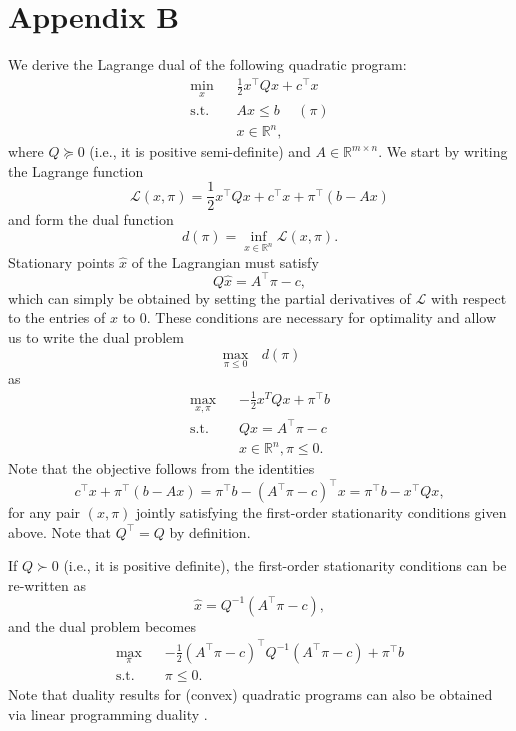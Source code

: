 \documentclass{article}
\begin{document}
\section*{Appendix B}
We derive the Lagrange dual of the following quadratic program:
\begin{align*}
\underset{x}{\min} \hspace{10pt} & \frac{1}{2}x^\top Q x + c^\top x\\
\mbox{s.t. } & Ax \le b \hspace{15pt} (\pi)\\
&x \in \mathbb{R}^n,
\end{align*}
where $Q \succeq 0$ (i.e., it is positive semi-definite) and $A \in \mathbb{R}^{m \times n}$. We start by writing the Lagrange function
\begin{equation*}
\mathcal{L}(x, \pi) = \frac{1}{2}x^\top Q x + c^\top x + \pi^\top(b - Ax)
\end{equation*}
and form the dual function
\begin{equation*}
d(\pi) = \underset{x \in \mathbb{R}^n}{\inf} \mathcal{L}(x, \pi).
\end{equation*}
Stationary points $\hat{x}$ of the Lagrangian must satisfy
\begin{equation*}
Q\hat{x} = A^\top \pi -c,
\end{equation*}
which can simply be obtained by setting the partial derivatives of $\mathcal{L}$ with respect to the entries of $x$ to $0$. These conditions are necessary for optimality and allow us to write the dual problem
\begin{equation*}
\underset{\pi \le 0}{\max} \mbox{ }d(\pi)
\end{equation*}
as
\begin{align*}
\underset{x, \pi}{\max} \hspace{10pt} & -\frac{1}{2}x^T Q x + \pi^\top b\\
\mbox{s.t. } & Qx = A^\top \pi -c\\
&x \in \mathbb{R}^n, \pi \le 0.
\end{align*}
Note that the objective follows from the identities
\begin{equation*}
c^\top x + \pi^\top(b - Ax) = \pi^\top b - (A^\top \pi - c)^\top x =  \pi^\top b - x^\top Q x,
\end{equation*}
for any pair $(x, \pi)$ jointly satisfying the first-order stationarity conditions given above. Note that $Q^\top = Q$ by definition. 

If $Q \succ 0$ (i.e., it is positive definite), the first-order stationarity conditions can be re-written as
\begin{equation*}
\hat{x} = Q^{-1}(A^\top \pi - c),
\end{equation*}
and the dual problem becomes
\begin{align*}
\underset{\pi}{\max} \hspace{10pt} & -\frac{1}{2}(A^\top \pi -c)^\top Q^{-1} (A^\top \pi -c) + \pi^\top b\\
\mbox{s.t. } & \pi \le 0.
\end{align*}
Note that duality results for (convex) quadratic programs can also be obtained via linear programming duality \cite{Dorn1960}.
\end{document}
